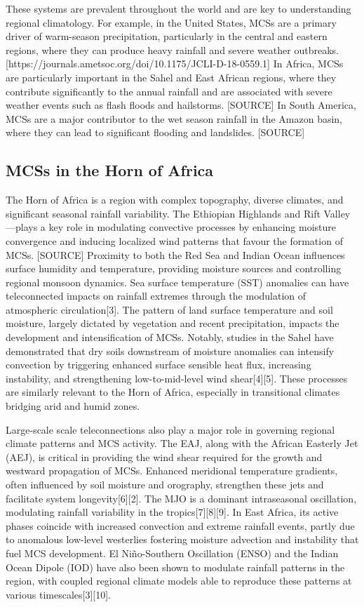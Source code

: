 These systems are prevalent throughout the world and are key to understanding regional climatology. For example, in the United States, MCSs are a primary driver of warm-season precipitation, particularly in the central and eastern regions, where they can produce heavy rainfall and severe weather outbreaks. [https://journals.ametsoc.org/doi/10.1175/JCLI-D-18-0559.1] In Africa, MCSs are particularly important in the Sahel and East African regions, where they contribute significantly to the annual rainfall and are associated with severe weather events such as flash floods and hailstorms. [SOURCE] In South America, MCSs are a major contributor to the wet season rainfall in the Amazon basin, where they can lead to significant flooding and landslides. [SOURCE]

\subsection{MCSs in the Horn of Africa}

The Horn of Africa is a region with complex topography, diverse climates, and significant seasonal rainfall variability. The Ethiopian Highlands and Rift Valley—plays a key role in modulating convective processes by enhancing moisture convergence and inducing localized wind patterns that favour the formation of MCSs. [SOURCE] Proximity to both the Red Sea and Indian Ocean influences surface humidity and temperature, providing moisture sources and controlling regional monsoon dynamics. Sea surface temperature (SST) anomalies can have teleconnected impacts on rainfall extremes through the modulation of atmospheric circulation[3]. The pattern of land surface temperature and soil moisture, largely dictated by vegetation and recent precipitation, impacts the development and intensification of MCSs. Notably, studies in the Sahel have demonstrated that dry soils downstream of moisture anomalies can intensify convection by triggering enhanced surface sensible heat flux, increasing instability, and strengthening low-to-mid-level wind shear[4][5]. These processes are similarly relevant to the Horn of Africa, especially in transitional climates bridging arid and humid zones.

Large-scale scale teleconnections also play a major role in governing regional climate patterns and MCS activity. The EAJ, along with the African Easterly Jet (AEJ), is critical in providing the wind shear required for the growth and westward propagation of MCSs. Enhanced meridional temperature gradients, often influenced by soil moisture and orography, strengthen these jets and facilitate system longevity[6][2]. The MJO is a dominant intraseasonal oscillation, modulating rainfall variability in the tropics[7][8][9]. In East Africa, its active phases coincide with increased convection and extreme rainfall events, partly due to anomalous low-level westerlies fostering moisture advection and instability that fuel MCS development. El Niño-Southern Oscillation (ENSO) and the Indian Ocean Dipole (IOD) have also been shown to modulate rainfall patterns in the region, with coupled regional climate models able to reproduce these patterns at various timescales[3][10].

